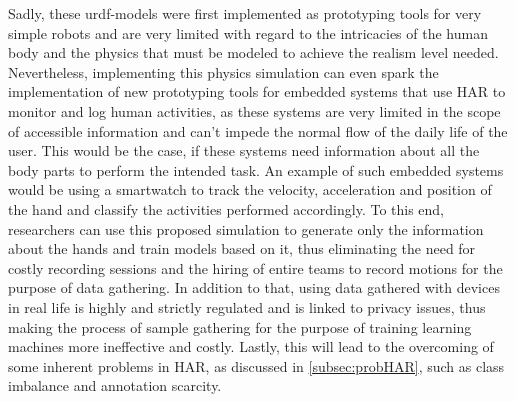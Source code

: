 Sadly, these urdf-models were first implemented as prototyping tools for very simple robots and are very limited with regard to the intricacies of the human body and the physics that must be modeled to achieve the realism level needed. Nevertheless, implementing this physics simulation can even spark the implementation of new prototyping tools for embedded systems that use HAR to monitor and log human activities, as these systems are very limited in the scope of accessible information and can't impede the normal flow of the daily life of the user. This would be the case, if these systems need information about all the body parts to perform the intended task. An example of such embedded systems would be using a smartwatch to track the velocity, acceleration and position of the hand and classify the activities performed accordingly. To this end, researchers can use this proposed simulation to generate only the information about the hands and train models based on it, thus eliminating the need for costly recording sessions and the hiring of entire teams to record motions for the purpose of data gathering. In addition to that, using data gathered with devices in real life is highly and strictly regulated and is linked to privacy issues, thus making the process of sample gathering for the purpose of training learning machines more ineffective and costly. Lastly, this will lead to the overcoming of some inherent problems in HAR, as discussed in \ref{subsec:probHAR}, such as class imbalance and annotation scarcity.
